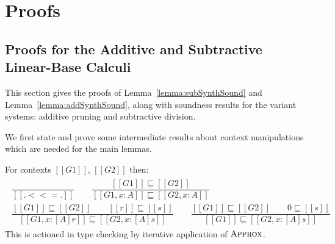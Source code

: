 \chapter{Proofs}
\label{appendix:proofs}
\section{Proofs for the Additive and Subtractive Linear-Base Calculi}
\label{sec:linear-proofs}
This section gives the proofs of Lemma~\ref{lemma:subSynthSound} and
Lemma~\ref{lemma:addSynthSound}, along with soundness results for the
variant systems: additive pruning and subtractive division.

We first state and prove some intermediate results about context manipulations
which are needed for the main lemmas.

\begin{definition}
For contexts $[[ G1 ]]$, $[[ G2 ]]$ then:
%
\begin{align*}
\begin{array}{c}
\dfrac{}{[[ . <<= . ]]}
\qquad
\dfrac{[[ G1 ]] \sqsubseteq [[ G2 ]]}
      {[[ G1, x : A ]] \sqsubseteq [[ G2, x : A ]]}
\qquad \\[1.5em]
\dfrac{[[ G1 ]] \sqsubseteq [[ G2 ]] \qquad [[ r ]] \sqsubseteq [[ s ]]}
      {[[ G1, x : [A] r ]] \sqsubseteq [[ G2, x : [A] s ]]}
\qquad
\dfrac{ [[ G1 ]] \sqsubseteq [[ G2 ]] \qquad 0 \sqsubseteq [[ s ]]}
      { [[ G1 ]] \sqsubseteq [[  {G2, x : [A] s} ]]}
\end{array}
\end{align*}
%
This is actioned in type checking by iterative application of $\textsc{Approx}$.
\end{definition}


